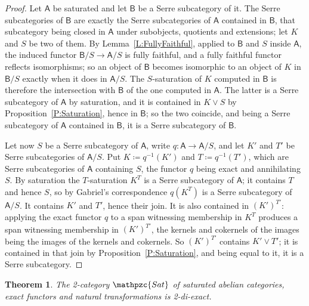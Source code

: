 \documentclass[reqno,a4paper]{amsart}
\numberwithin{equation}{section}
\theoremstyle{plain}
\newtheorem{theorem}[subsection]{Theorem}
\theoremstyle{definition}
\def\nameit#1{\textrm{#1}~}
\def\prox{\nameit{Proposition}}
\def\lemx{\nameit{Lemma}}
\newcommand{\catfont}[1]{\ensuremath{\mathpzc{#1}}\xspace}
\newcommand{\onecat}[1]{\ensuremath{\mathsf{#1}}\xspace}
\newcommand{\Sat}{\catfont{Sat}}
\renewcommand{\1}{\onecat{1}}
\begin{document}
\begin{proof}
	Let \(\onecat{A}\) be saturated and let \(\onecat{B}\) be a Serre subcategory of it. The Serre subcategories of \(\onecat{B}\) are exactly the Serre subcategories of \(\onecat{A}\) contained in \(\onecat{B}\), that subcategory being closed in \(\onecat{A}\) under subobjects, quotients and extensions; let \(K\) and \(S\) be two of them. By \lemx\ref{L:FullyFaithful}, applied to \(\onecat{B}\) and \(S\) inside \(\onecat{A}\), the induced functor \(\onecat{B}/S\to\onecat{A}/S\) is fully faithful, and a fully faithful functor reflects isomorphisms; so an object of \(\onecat{B}\) becomes isomorphic to an object of \(K\) in \(\onecat{B}/S\) exactly when it does in \(\onecat{A}/S\). The \(S\)-saturation of \(K\) computed in \(\onecat{B}\) is therefore the intersection with \(\onecat{B}\) of the one computed in \(\onecat{A}\). The latter is a Serre subcategory of \(\onecat{A}\) by saturation, and it is contained in \(K\vee S\) by \prox\ref{P:Saturation}, hence in \(\onecat{B}\); so the two coincide, and being a Serre subcategory of \(\onecat{A}\) contained in \(\onecat{B}\), it is a Serre subcategory of \(\onecat{B}\).

	Let now \(S\) be a Serre subcategory of \(\onecat{A}\), write \(q\colon\onecat{A}\to\onecat{A}/S\), and let \(K'\) and \(T'\) be Serre subcategories of \(\onecat{A}/S\). Put \(K\coloneq q^{-1}(K')\) and \(T\coloneq q^{-1}(T')\), which are Serre subcategories of \(\onecat{A}\) containing \(S\), the functor \(q\) being exact and annihilating \(S\). By saturation the \(T\)-saturation \(K^{T}\) is a Serre subcategory of \(\onecat{A}\); it contains \(T\) and hence \(S\), so by Gabriel's correspondence \(q(K^{T})\) is a Serre subcategory of \(\onecat{A}/S\). It contains \(K'\) and \(T'\), hence their join. It is also contained in \((K')^{T'}\): applying the exact functor \(q\) to a span witnessing membership in \(K^{T}\) produces a span witnessing membership in \((K')^{T'}\), the kernels and cokernels of the images being the images of the kernels and cokernels. So \((K')^{T'}\) contains \(K'\vee T'\); it is contained in that join by \prox\ref{P:Saturation}, and being equal to it, it is a Serre subcategory.
\end{proof}

\begin{theorem}\label{T:SatModel}
	The 2-category \(\Sat\) of saturated abelian categories, exact functors and natural transformations is 2-di-exact.
\end{theorem}
\end{document}
